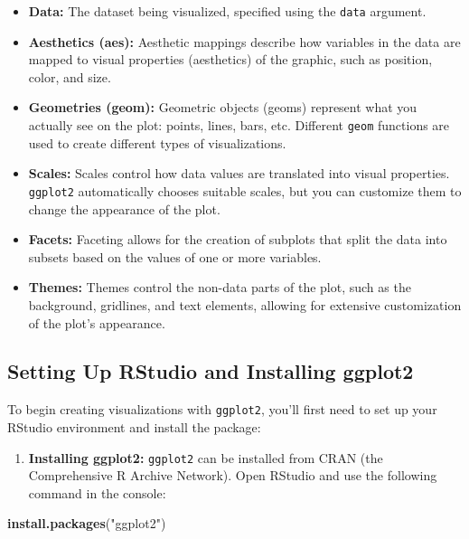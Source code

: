 \documentclass[
]{book}
\newenvironment{Shaded}{\begin{snugshade}}{\end{snugshade}}
\newcommand{\FunctionTok}[1]{\textcolor[rgb]{0.13,0.29,0.53}{\textbf{#1}}}
\newcommand{\NormalTok}[1]{#1}
\newcommand{\StringTok}[1]{\textcolor[rgb]{0.31,0.60,0.02}{#1}}
\providecommand{\tightlist}{%
  \setlength{\itemsep}{0pt}\setlength{\parskip}{0pt}}
\begin{document}
\begin{itemize}
\tightlist
\item
  \textbf{Data:} The dataset being visualized, specified using the \texttt{data} argument.
\item
  \textbf{Aesthetics (aes):} Aesthetic mappings describe how variables in the data are mapped to visual properties (aesthetics) of the graphic, such as position, color, and size.
\item
  \textbf{Geometries (geom):} Geometric objects (geoms) represent what you actually see on the plot: points, lines, bars, etc. Different \texttt{geom} functions are used to create different types of visualizations.
\item
  \textbf{Scales:} Scales control how data values are translated into visual properties. \texttt{ggplot2} automatically chooses suitable scales, but you can customize them to change the appearance of the plot.
\item
  \textbf{Facets:} Faceting allows for the creation of subplots that split the data into subsets based on the values of one or more variables.
\item
  \textbf{Themes:} Themes control the non-data parts of the plot, such as the background, gridlines, and text elements, allowing for extensive customization of the plot's appearance.
\end{itemize}

\hypertarget{setting-up-rstudio-and-installing-ggplot2}{%
\subsection{Setting Up RStudio and Installing ggplot2}\label{setting-up-rstudio-and-installing-ggplot2}}

To begin creating visualizations with \texttt{ggplot2}, you'll first need to set up your RStudio environment and install the package:

\begin{enumerate}
\def\labelenumi{\arabic{enumi}.}
\tightlist
\item
  \textbf{Installing ggplot2:} \texttt{ggplot2} can be installed from CRAN (the Comprehensive R Archive Network). Open RStudio and use the following command in the console:
\end{enumerate}

\begin{Shaded}
\begin{Highlighting}[]
\FunctionTok{install.packages}\NormalTok{(}\StringTok{"ggplot2"}\NormalTok{)}
\end{Highlighting}
\end{Shaded}
\end{document}
